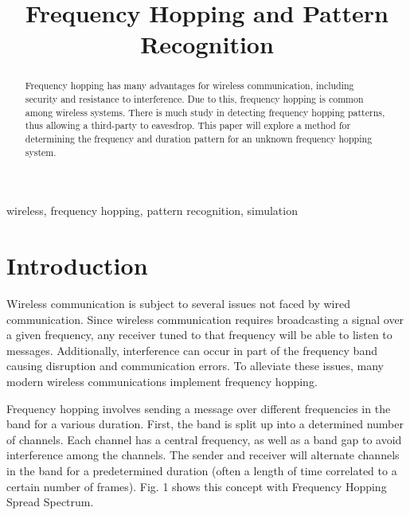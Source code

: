 \documentclass[conference]{IEEEtran}
\begin{document}
\title{Frequency Hopping and Pattern Recognition}

\author{
}

\maketitle

\begin{abstract}
Frequency hopping has many advantages for wireless communication, including security and resistance to interference.
Due to this, frequency hopping is common among wireless systems.
There is much study in detecting frequency hopping patterns, thus allowing a third-party to eavesdrop.
This paper will explore a method for determining the frequency and duration pattern for an unknown frequency hopping system.
\end{abstract}

\begin{IEEEkeywords}
wireless, frequency hopping, pattern recognition, simulation
\end{IEEEkeywords}

\section{Introduction}
Wireless communication is subject to several issues not faced by wired communication.
Since wireless communication requires broadcasting a signal over a given frequency, any receiver tuned to that frequency will be able to listen to messages.
Additionally, interference can occur in part of the frequency band causing disruption and communication errors.
To alleviate these issues, many modern wireless communications implement frequency hopping.

Frequency hopping involves sending a message over different frequencies in the band for a various duration.
First, the band is split up into a determined number of channels. Each channel has a central frequency, as well as a band gap to avoid interference among the channels.
The sender and receiver will alternate channels in the band for a predetermined duration (often a length of time correlated to a certain number of frames).
Fig. 1 shows this concept with Frequency Hopping Spread Spectrum.
\end{document}
